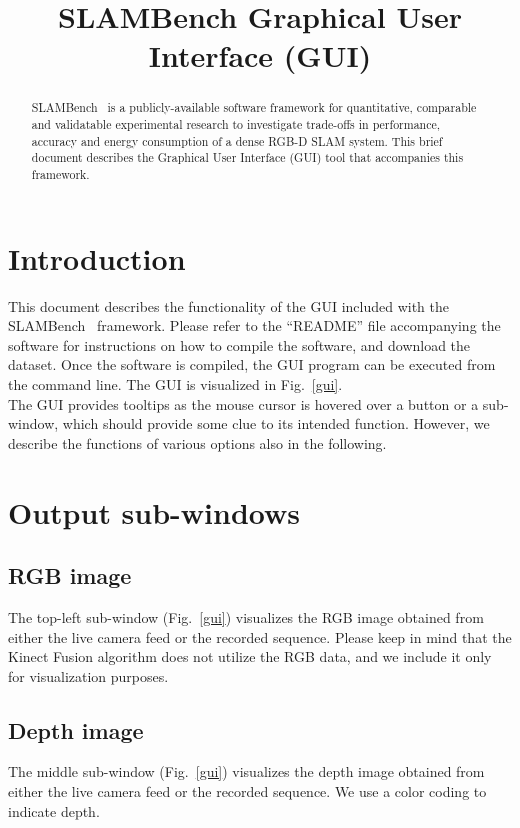 \documentclass[12pt]{article}
\begin{document}
\title{SLAMBench Graphical User Interface (GUI)}

\maketitle

\begin{abstract}
SLAMBench~\cite{2014Nardi} is a publicly-available software framework for quantitative, comparable and validatable experimental research to investigate trade-offs in performance, accuracy and energy consumption of a dense RGB-D SLAM system. This brief document describes the Graphical User Interface (GUI) tool that accompanies this framework.
\end{abstract}

\section{Introduction}
This document describes the functionality of the GUI included with the SLAMBench~\cite{2014Nardi} framework. Please refer to the ``README'' file accompanying the software for instructions on how to compile the software, and download the dataset. Once the software is compiled, the GUI program can be executed from the command line. The GUI is visualized in Fig.~\ref{gui}.\\

The GUI provides tooltips as the mouse cursor is hovered over a button or a sub-window, which should provide some clue to its intended function. However, we describe the functions of various options also in the following.\\

\section{Output sub-windows}

\subsection{RGB image}
The top-left sub-window (Fig.~\ref{gui}) visualizes the RGB image obtained from either the live camera feed or the recorded sequence. Please keep in mind that the Kinect Fusion algorithm does not utilize the RGB data, and we include it only for visualization purposes.

\subsection{Depth image}
The middle sub-window (Fig.~\ref{gui}) visualizes the depth image obtained from either the live camera feed or the recorded sequence. We use a color coding to indicate depth.
\end{document}

